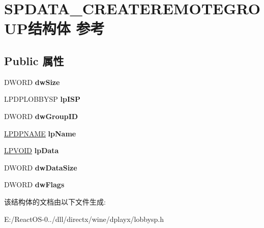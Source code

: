 \hypertarget{struct_s_p_d_a_t_a___c_r_e_a_t_e_r_e_m_o_t_e_g_r_o_u_p}{}\section{S\+P\+D\+A\+T\+A\+\_\+\+C\+R\+E\+A\+T\+E\+R\+E\+M\+O\+T\+E\+G\+R\+O\+U\+P结构体 参考}
\label{struct_s_p_d_a_t_a___c_r_e_a_t_e_r_e_m_o_t_e_g_r_o_u_p}
\subsection*{Public 属性}
\begin{DoxyCompactItemize}
\item 
\mbox{\label{struct_s_p_d_a_t_a___c_r_e_a_t_e_r_e_m_o_t_e_g_r_o_u_p_a100a7d2b3874724c88092c6d143b7e46}} 
D\+W\+O\+RD {\bfseries dw\+Size}
\item 
\mbox{\label{struct_s_p_d_a_t_a___c_r_e_a_t_e_r_e_m_o_t_e_g_r_o_u_p_a758baff971a91f44c4b6aa0cc4e93bfa}} 
L\+P\+D\+P\+L\+O\+B\+B\+Y\+SP {\bfseries lp\+I\+SP}
\item 
\mbox{\label{struct_s_p_d_a_t_a___c_r_e_a_t_e_r_e_m_o_t_e_g_r_o_u_p_a1fce1142694b77852bbe8c9cf55802bd}} 
D\+W\+O\+RD {\bfseries dw\+Group\+ID}
\item 
\mbox{\label{struct_s_p_d_a_t_a___c_r_e_a_t_e_r_e_m_o_t_e_g_r_o_u_p_ae00991eed076bbe7d3b3372422dc0ce9}} 
\hyperlink{structtag_d_p_n_a_m_e}{L\+P\+D\+P\+N\+A\+ME} {\bfseries lp\+Name}
\item 
\mbox{\label{struct_s_p_d_a_t_a___c_r_e_a_t_e_r_e_m_o_t_e_g_r_o_u_p_aaa6060e048d02ae1c0214c5d6d3b23f0}} 
\hyperlink{interfacevoid}{L\+P\+V\+O\+ID} {\bfseries lp\+Data}
\item 
\mbox{\label{struct_s_p_d_a_t_a___c_r_e_a_t_e_r_e_m_o_t_e_g_r_o_u_p_a9b9917006e12b9979913b746ef1762d8}} 
D\+W\+O\+RD {\bfseries dw\+Data\+Size}
\item 
\mbox{\label{struct_s_p_d_a_t_a___c_r_e_a_t_e_r_e_m_o_t_e_g_r_o_u_p_afae653b638e8355d8c57d23cfbf9d275}} 
D\+W\+O\+RD {\bfseries dw\+Flags}
\end{DoxyCompactItemize}


该结构体的文档由以下文件生成\+:\begin{DoxyCompactItemize}
\item 
E\+:/\+React\+O\+S-\/0../dll/directx/wine/dplayx/lobbysp.\+h\end{DoxyCompactItemize}
